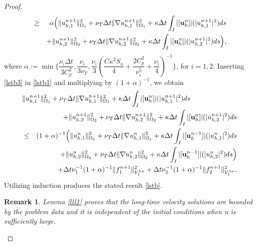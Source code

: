 \documentclass[10pt]{article}%
\numberwithin{equation}{section}
\newtheorem{remark}{Remark}[section]
\newcommand{\bu}{{\bf u}}
\begin{document}
\begin{proof}
\begin{eqnarray}
		 &\geq&\alpha\Big(\|{u^{n+1}_{h,1}}\|_{\Omega_1}^2 +\nu_T\Delta t\|\nabla  u_{h,1}^{n+1}\|^2_{\Omega_1} +{\kappa} \Delta t \int_{I}|[\bu_h^n]| (|u_{h,1}^{n+1}|^2)ds\nonumber\\&&+\|{u^{n+1}_{h,2}}\|_{\Omega_2}^2 +\nu_T\Delta t\|\nabla  u_{h,2}^{n+1}\|^2_{\Omega_2} +{\kappa} \Delta t \int_{I}|[\bu_h^n]| (|u_{h,2}^{n+1}|^2)ds\Big),\label{lstb3}
	\end{eqnarray}
	where $\alpha:=\min\Big\{\dfrac{\nu_i\Delta t}{3C_p^2},\dfrac{\nu_i}{3\nu_T},\dfrac{\nu_i}{3}(\dfrac{C\kappa^2S_n}{4}+\dfrac{2C_p^2}{\nu_i^5}+\dfrac{\nu_i}{4})^{-1}\Big\}$, for $i=1,2$. Inserting \eqref{lstb3} in \eqref{lstb1} and multiplying by $(1+\alpha)^{-1}$, we obtain
	\begin{eqnarray}
\lefteqn{\|{u^{n+1}_{h,1}}\|_{\Omega_1}^2 +\nu_T\Delta t\|\nabla  u_{h,1}^{n+1}\|^2_{\Omega_1}+{\kappa} \Delta t \int_{I}|[\bu_h^n]| (|u_{h,1}^{n+1}|^2)ds}\nonumber\\&&+\|{u^{n+1}_{h,2}}\|_{\Omega_2}^2 +\nu_T\Delta t\|\nabla  u_{h,2}^{n+1}\|^2_{\Omega_2} +{\kappa} \Delta t \int_{I}|[\bu_h^n]| (|u_{h,2}^{n+1}|^2)ds\nonumber\\
&\leq&(1+\alpha)^{-1}\Big(\|{u^{n}_{h,1}}\|_{\Omega_1}^2+\nu_T\Delta t \|\nabla u_{h,1}^{n}\|_{\Omega_1}^2+\kappa \Delta t\int_{I}|[\bu_h^{n-1}]| (|u_{h,1}^{n}|^2)ds\nonumber\\
&&+\|{u^{n}_{h,2}}\|_{\Omega_2}^2+\nu_T\Delta t \|\nabla u_{h,2}^{n}\|_{\Omega_2}^2+\kappa \Delta t\int_{I}|[\bu_h^{n-1}]| (|u_{h,2}^{n}|^2)ds\Big)\nonumber
\\&& +\Delta t\nu_1^{-1}(1+\alpha)^{-1}\|f_1^{n+1}\|_{V_1^{h*}}^2+\Delta t\nu_2^{-1}(1+\alpha)^{-1}\|f_2^{n+1}\|_{V_1^{h*}}^2.\label{lstb4}
\end{eqnarray}
Utilizing induction produces the stated result \eqref{lstb}.
	\begin{remark}
Lemma \ref{lll1} proves that the long-time velocity solutions are bounded by the problem data and it is independent of the initial conditions when n is sufficiently large.
\end{remark}	
\end{proof}
\end{document}
